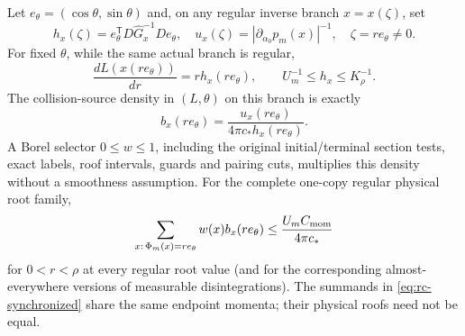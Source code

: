 \begin{theorem}
\label{thm:rc-coarea}
Let $e_\theta=(\cos\theta,\sin\theta)$ and, on any regular inverse
branch $x=x(\zeta)$, set
\begin{equation}\label{eq:rc-h-and-u}
 h_x(\zeta)=e_\theta^{\mathsf T}D\widehat G_x^{-1}De_\theta,
 \quad
 u_x(\zeta)=|\partial_{\alpha_0}p_m(x)|^{-1},
 \quad \zeta=re_\theta\ne0.
\end{equation}
For fixed $\theta$, while the same actual branch is regular,
\begin{equation}\label{eq:rc-radial}
 \frac{dL(x(re_\theta))}{dr}=r h_x(re_\theta),\qquad
 U_m^{-1}\le h_x\le K_\rho^{-1}.
\end{equation}
The collision-source density in $(L,\theta)$ on this branch is exactly
\begin{equation}\label{eq:rc-coarea-density}
 b_x(re_\theta)=\frac{u_x(re_\theta)}{4\pi c_*h_x(re_\theta)}.
\end{equation}
A Borel selector $0\le w\le1$, including the original initial/terminal
section tests, exact labels, roof intervals, guards and pairing cuts,
multiplies this density without a smoothness assumption. For the
complete one-copy regular physical root family,
\begin{equation}\label{eq:rc-synchronized}
 \sum_{x:\,\Phi_m(x)=re_\theta} w(x)b_x(re_\theta)
       \le \frac{U_m C_{\rm mom}}{4\pi c_*}
\end{equation}
for $0<r<\rho$ at every regular root value (and for the corresponding
almost-everywhere versions of measurable disintegrations).
The summands in \eqref{eq:rc-synchronized} share the same endpoint
momenta; their physical roofs need not be equal.
\end{theorem}
